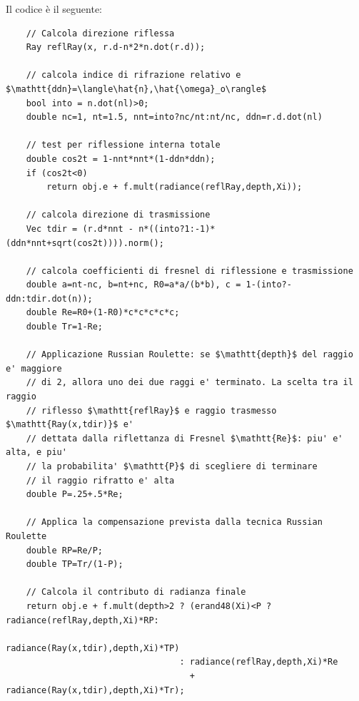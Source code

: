 Il codice \`e il seguente:
\begin{verbatim}
	// Calcola direzione riflessa
	Ray reflRay(x, r.d-n*2*n.dot(r.d));

	// calcola indice di rifrazione relativo e $\mathtt{ddn}=\langle\hat{n},\hat{\omega}_o\rangle$
	bool into = n.dot(nl)>0;
	double nc=1, nt=1.5, nnt=into?nc/nt:nt/nc, ddn=r.d.dot(nl)

	// test per riflessione interna totale
	double cos2t = 1-nnt*nnt*(1-ddn*ddn);
	if (cos2t<0)
		return obj.e + f.mult(radiance(reflRay,depth,Xi));

	// calcola direzione di trasmissione
	Vec tdir = (r.d*nnt - n*((into?1:-1)*(ddn*nnt+sqrt(cos2t)))).norm();

	// calcola coefficienti di fresnel di riflessione e trasmissione
	double a=nt-nc, b=nt+nc, R0=a*a/(b*b), c = 1-(into?-ddn:tdir.dot(n));
	double Re=R0+(1-R0)*c*c*c*c*c;
	double Tr=1-Re;

	// Applicazione Russian Roulette: se $\mathtt{depth}$ del raggio e' maggiore 
	// di 2, allora uno dei due raggi e' terminato. La scelta tra il raggio 
	// riflesso $\mathtt{reflRay}$ e raggio trasmesso $\mathtt{Ray(x,tdir)}$ e' 
	// dettata dalla riflettanza di Fresnel $\mathtt{Re}$: piu' e' alta, e piu' 
	// la probabilita' $\mathtt{P}$ di scegliere di terminare 
	// il raggio rifratto e' alta
	double P=.25+.5*Re;

	// Applica la compensazione prevista dalla tecnica Russian Roulette
	double RP=Re/P;
	double TP=Tr/(1-P);

	// Calcola il contributo di radianza finale
	return obj.e + f.mult(depth>2 ? (erand48(Xi)<P ? radiance(reflRay,depth,Xi)*RP:
	                                                 radiance(Ray(x,tdir),depth,Xi)*TP)
	                              : radiance(reflRay,depth,Xi)*Re 
	                                + radiance(Ray(x,tdir),depth,Xi)*Tr);
\end{verbatim}
